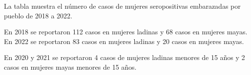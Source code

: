 La tabla muestra el número de casos de mujeres seropositivas embarazadas por pueblo de 2018 a 2022.  

En 2018 se reportaron 112 casos en mujeres ladinas y 68 casos en mujeres mayas. En 2022 se reportaron 83 casos en mujeres ladinas y 20 casos en mujeres mayas. 

En 2020 y 2021 se reportaron 4 casos de mujeres ladinas menores de 15 años y 2 casos en mujeres mayas menores de 15 años. 